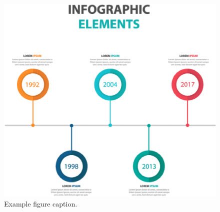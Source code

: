 \documentclass[9pt, twoside, twocolumn]{extarticle}
\begin{document}
\begin{figure}
    \centering
    \includegraphics[width=0.8\linewidth]{diagram.png}
    \caption{Example figure caption.}
    \label{fig:example}
\end{figure}
\end{document}
